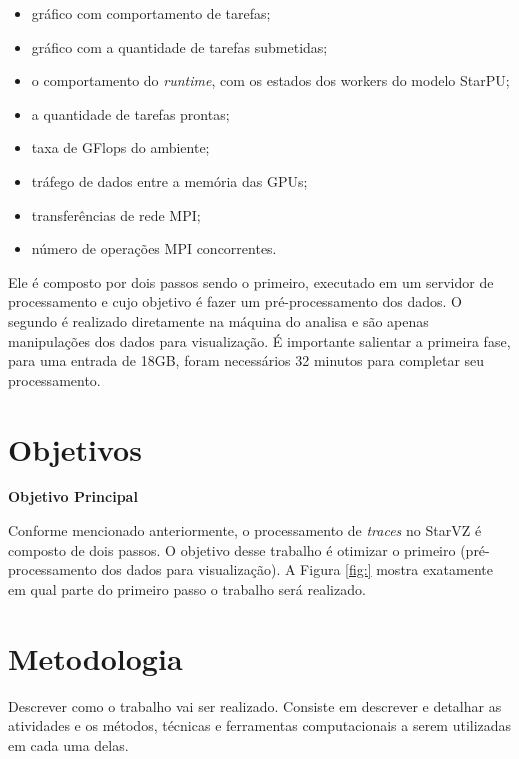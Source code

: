\documentclass[prop-esp]{iiufrgs}
\begin{document}
\begin{itemize}
    \item gráfico com comportamento de tarefas;
    \item gráfico com a quantidade de tarefas submetidas;
    \item o comportamento do \emph{runtime}, com os estados dos workers do modelo StarPU;
    \item a quantidade de tarefas prontas;
    \item taxa de GFlops do ambiente;
    \item tráfego de dados entre a memória das GPUs;
    \item transferências de rede MPI;
    \item número de operações MPI concorrentes.
\end{itemize}

Ele é composto por dois passos sendo o primeiro, executado em um servidor de processamento e cujo objetivo é fazer um pré-processamento dos dados.
O segundo é realizado diretamente na máquina do analisa e são apenas manipulações dos dados para visualização. É importante salientar a primeira fase, para uma entrada de 18GB, foram necessários 32 minutos para completar seu processamento.


%
\chapter{Objetivos}

\noindent \textbf{Objetivo Principal} 

Conforme mencionado anteriormente, o processamento de \emph{traces} no StarVZ é composto de dois passos. O objetivo desse trabalho é otimizar o primeiro (pré-processamento dos dados para visualização). A Figura \ref{fig:} mostra exatamente em qual parte do primeiro passo o trabalho será realizado. 


%
\chapter{Metodologia}

Descrever como o trabalho vai ser realizado. Consiste em descrever e detalhar as atividades e os métodos, técnicas e ferramentas computacionais a serem utilizadas em cada uma delas. 
\end{document}
